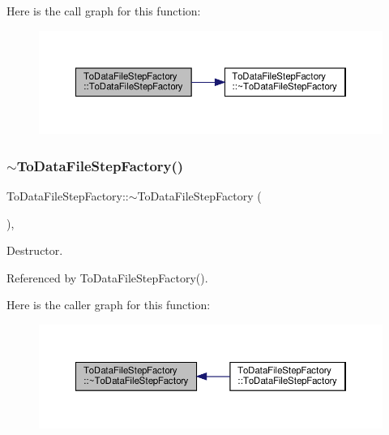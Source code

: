 Here is the call graph for this function\+:
\nopagebreak
\begin{figure}[H]
\begin{center}
\leavevmode
\includegraphics[width=350pt]{dc/d99/classToDataFileStepFactory_a04cc9c9f141172cb09ad8d0f39040794_cgraph}
\end{center}
\end{figure}
\mbox{\label{classToDataFileStepFactory_a03b7ad5b6db79448ab7c7fd4b236b9c9}} 
\subsubsection{\texorpdfstring{$\sim$\+To\+Data\+File\+Step\+Factory()}{~ToDataFileStepFactory()}}
{\footnotesize\ttfamily To\+Data\+File\+Step\+Factory\+::$\sim$\+To\+Data\+File\+Step\+Factory (\begin{DoxyParamCaption}{ }\end{DoxyParamCaption})\hspace{0.3cm}{\ttfamily [override]}, {\ttfamily [default]}}



Destructor. 



Referenced by To\+Data\+File\+Step\+Factory().

Here is the caller graph for this function\+:
\nopagebreak
\begin{figure}[H]
\begin{center}
\leavevmode
\includegraphics[width=350pt]{dc/d99/classToDataFileStepFactory_a03b7ad5b6db79448ab7c7fd4b236b9c9_icgraph}
\end{center}
\end{figure}


